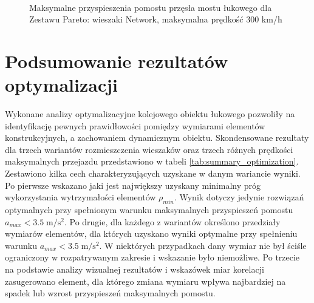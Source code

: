 \begin{figure}[hbt!]
	\centering
	\\
	\captionsetup{justification=centering}
	\caption{Maksymalne przyspieszenia pomostu przęsła mostu łukowego dla Zestawu Pareto: wieszaki Network, maksymalna prędkość 300 km/h}
	\label{fig:wk2_opti_netw_300_var_dom}
\end{figure}





\pagebreak[4]

\section{Podsumowanie rezultatów optymalizacji}

Wykonane analizy optymalizacyjne kolejowego obiektu łukowego pozwoliły na identyfikację pewnych prawidłowości pomiędzy wymiarami elementów konstrukcyjnych, a zachowaniem dynamicznym obiektu. Skondensowane rezultaty dla trzech wariantów rozmieszczenia wieszaków oraz trzech różnych prędkości maksymalnych przejazdu przedstawiono w tabeli \ref{tab:summary_optimization}. Zestawiono kilka cech charakteryzujących uzyskane w danym wariancie wyniki. Po pierwsze wskazano jaki jest największy uzyskany minimalny próg wykorzystania wytrzymałości elementów $\rho_{min}$. Wynik dotyczy jedynie rozwiązań optymalnych przy spełnionym warunku maksymalnych przyspieszeń pomostu $a_{max}<3.5\;\mathrm{m/s^2}$. Po drugie, dla każdego z wariantów określono przedziały wymiarów elementów, dla których uzyskano wyniki optymalne przy spełnieniu warunku $a_{max}<3.5\;\mathrm{m/s^2}$. W niektórych przypadkach dany wymiar nie był ściśle ograniczony w rozpatrywanym zakresie i wskazanie było niemożliwe. Po trzecie na podstawie analizy wizualnej rezultatów i wskazówek miar korelacji zasugerowano element, dla którego zmiana wymiaru wpływa najbardziej na spadek lub wzrost przyspieszeń maksymalnych pomostu. 

